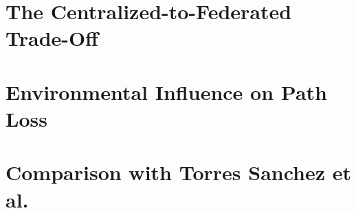 


\section{The Centralized-to-Federated Trade-Off}
\label{sec:tradeoff}


\section{Environmental Influence on Path Loss}
\label{sec:env-influence}


\section{Comparison with Torres Sanchez et al.}
\label{sec:comparison-torres}

